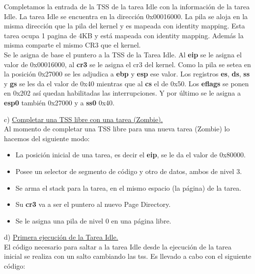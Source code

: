 \documentclass[a4paper]{article}
\begin{document}
Completamos la entrada de la TSS de la tarea Idle con la informaci\'on de la tarea Idle. La tarea Idle se encuentra en la direcci\'on 0x00016000. La pila se aloja en la misma direcci\'on que la pila del kernel y es mapeada con identity mapping. Esta tarea ocupa 1 pagina de 4KB y est\'a mapeada con identity mapping. Adem\'as la misma comparte el mismo CR3 que el kernel. \\

Se le asigna de base el puntero a la TSS de la Tarea Idle. Al \textbf{eip} se le asigna el valor de 0x00016000, al \textbf{cr3} se le asigna el cr3 del kernel. Como la pila se setea en la posici\'on 0x27000 se les adjudica a \textbf{ebp} y \textbf{esp} ese valor. Los registros \textbf{es}, \textbf{ds}, \textbf{ss} y \textbf{gs} se les da el valor de 0x40 mientras que al \textbf{cs} el de 0x50. Los \textbf{eflags} se ponen en 0x202 as\'i quedan habilitadas las interrupciones. Y por \'ultimo se le asigna a \textbf{esp0} tambi\'en 0x27000 y a \textbf{ss0} 0x40.\\
\bigskip

{\large c)} \underline{Completar una TSS libre con una tarea (Zombie).}\\

Al momento de completar una TSS libre para una nueva tarea (Zombie) lo hacemos del siguiente modo:

\begin{itemize}
 \item La posición inicial de una tarea, es decir el \textbf{eip}, se le da el valor de 0x80000.
\item Posee un selector de segmento de código y otro de datos, ambos de nivel 3.
\item Se arma el stack para la tarea, en el mismo espacio (la página) de la tarea.
\item Su \textbf{cr3} va a ser el puntero al nuevo Page Directory.
\item Se le asigna una pila de nivel 0 en una página libre.
 \end{itemize}



\bigskip


{\large d)} \underline{Primera ejecuci\'on de la Tarea Idle.}\\

El c\'odigo necesario para saltar a la tarea Idle desde la ejecuci\'on de la tarea inicial se realiza con un salto cambiando las tss. 
Es llevado a cabo con el siguiente c\'odigo:\\
\end{document}
